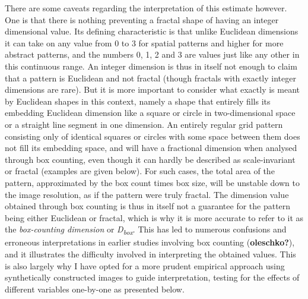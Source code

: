 \documentclass[
  12pt,
  a4paper, twoside]{book}
\begin{document}
There are some caveats regarding the interpretation of this estimate however. One is that there is nothing preventing a fractal shape of having an integer dimensional value. Its defining characteristic is that unlike Euclidean dimensions it can take on any value from 0 to 3 for spatial patterns and higher for more abstract patterns, and the numbers 0, 1, 2 and 3 are values just like any other in this continuous range. An integer dimension is thus in itself not enough to claim that a pattern is Euclidean and not fractal (though fractals with exactly integer dimensions are rare). But it is more important to consider what exactly is meant by Euclidean shapes in this context, namely a shape that entirely fills its embedding Euclidean dimension like a square or circle in two-dimensional space or a straight line segment in one dimension. An entirely regular grid pattern consisting only of identical squares or circles with some space between them does not fill its embedding space, and will have a fractional dimension when analysed through box counting, even though it can hardly be described as scale-invariant or fractal (examples are given below). For such cases, the total area of the pattern, approximated by the box count times box size, will be unstable down to the image resolution, as if the pattern were truly fractal. The dimension value obtained through box counting is thus in itself not a guarantee for the pattern being either Euclidean or fractal, which is why it is more accurate to refer to it as the \emph{box-counting dimension} or \emph{D\textsubscript{box}}. This has led to numerous confusions and erroneous interpretations in earlier studies involving box counting (\textbf{oleschko?}), and it illustrates the difficulty involved in interpreting the obtained values. This is also largely why I have opted for a more prudent empirical approach using synthetically constructed images to guide interpretation, testing for the effects of different variables one-by-one as presented below.
\end{document}
